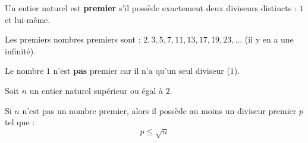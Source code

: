 \begin{definition}
	Un entier naturel est \textbf{premier} s'il possède exactement deux diviseurs distincts : $1$ et lui-même.
\end{definition}

\begin{exemple}
	Les premiers nombres premiers sont : $2, 3, 5, 7, 11, 13, 17, 19, 23, \ldots$ (il y en a une infinité).

\end{exemple}

\begin{rem}
	Le nombre $1$ n'est \textbf{pas} premier car il n'a qu'un seul diviseur ($1$).
\end{rem}

\newpage

\begin{propriete}
	Soit $n$ un entier naturel supérieur ou égal à $2$.

	Si $n$ n'est pas un nombre premier, alors il possède au moins un diviseur premier $p$ tel que :
	\[
		p \leqslant \sqrt{n}
	\]
\end{propriete}

